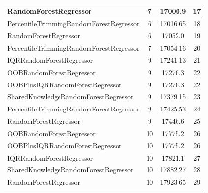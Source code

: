 \begin{table}[h]
\begin{tabular}{|l|c|c|c|}
\textcolor[HTML]{87bc45}{RandomForestRegressor} & 7 & 17000.9 & 17 \\ \hline
\textcolor[HTML]{f46a9b}{PercentileTrimmingRandomForestRegressor} & 6 & 17016.65 & 18 \\ \hline
\textcolor[HTML]{87bc45}{RandomForestRegressor} & 6 & 17052.0 & 19 \\ \hline
\textcolor[HTML]{f46a9b}{PercentileTrimmingRandomForestRegressor} & 7 & 17054.16 & 20 \\ \hline
\textcolor[HTML]{27aeef}{IQRRandomForestRegressor} & 9 & 17241.13 & 21 \\ \hline
\textcolor[HTML]{b33dc6}{OOBRandomForestRegressor} & 9 & 17276.3 & 22 \\ \hline
\textcolor[HTML]{ede15b}{OOBPlusIQRRandomForestRegressor} & 9 & 17276.3 & 22 \\ \hline
\textcolor[HTML]{ef9b20}{SharedKnowledgeRandomForestRegressor} & 9 & 17379.15 & 23 \\ \hline
\textcolor[HTML]{f46a9b}{PercentileTrimmingRandomForestRegressor} & 9 & 17425.53 & 24 \\ \hline
\textcolor[HTML]{87bc45}{RandomForestRegressor} & 9 & 17446.6 & 25 \\ \hline
\textcolor[HTML]{b33dc6}{OOBRandomForestRegressor} & 10 & 17775.2 & 26 \\ \hline
\textcolor[HTML]{ede15b}{OOBPlusIQRRandomForestRegressor} & 10 & 17775.2 & 26 \\ \hline
\textcolor[HTML]{27aeef}{IQRRandomForestRegressor} & 10 & 17821.1 & 27 \\ \hline
\textcolor[HTML]{ef9b20}{SharedKnowledgeRandomForestRegressor} & 10 & 17882.27 & 28 \\ \hline
\textcolor[HTML]{87bc45}{RandomForestRegressor} & 10 & 17923.65 & 29 \\ \hline
\end{tabular}
\end{table}

